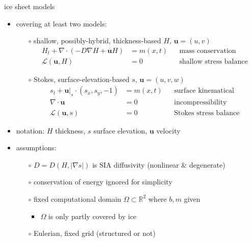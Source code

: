 \documentclass[hide notes,intlimits,usenames,dvipsnames]{beamer}
\newcommand{\RR}{\mathbb{R}}
\newcommand{\Div}{\nabla\cdot}
\newcommand{\grad}{\nabla}
\renewcommand{\bar}{\overline}
\begin{document}
\begin{frame}{ice sheet models}

\begin{itemize}
\item covering at least two models:
    \begin{itemize}
    \item[$\circ$] shallow, possibly-hybrid, thickness-based \hfill {\scriptsize\color{Gray} $H,\, \mathbf{u}=(u,v)$}
        \begin{align*}
        H_t + \Div (-D \grad H + \bar{\mathbf{u}} H) &= m(x,t) && \text{mass conservation} \\
        \mathcal{L}(\mathbf{u},H) &= 0      && \text{shallow stress balance}
        \end{align*}
    \item[$\circ$] Stokes, surface-elevation-based \hfill {\scriptsize\color{Gray} $s,\, \mathbf{u}=(u,v,w)$}
        \begin{align*}
        s_t + \mathbf{u}\big|_s \cdot (s_x,s_y,-1) &= m(x,t) && \text{surface kinematical} \\
        \Div \mathbf{u} &= 0            && \text{incompressibility} \\
        \mathcal{L}(\mathbf{u},s) &= 0  && \text{Stokes stress balance}
        \end{align*}
    \end{itemize}
\item notation: $H$ thickness, $s$ surface elevation, $\mathbf{u}$ velocity
\item assumptions:
    \begin{itemize}
    \item[$\circ$] $D=D(H,|\grad s|)$ is SIA diffusivity (nonlinear \& degenerate)
    \item[$\circ$] conservation of energy ignored for simplicity
    \item[$\circ$] fixed computational domain $\Omega\subset \RR^2$ where $b,m$ given
        \begin{itemize}
        \item $\Omega$ is only partly covered by ice
        \end{itemize}
    \item[$\circ$] Eulerian, fixed grid (structured or not)
    \end{itemize}
\end{itemize}
\end{frame}
\end{document}
